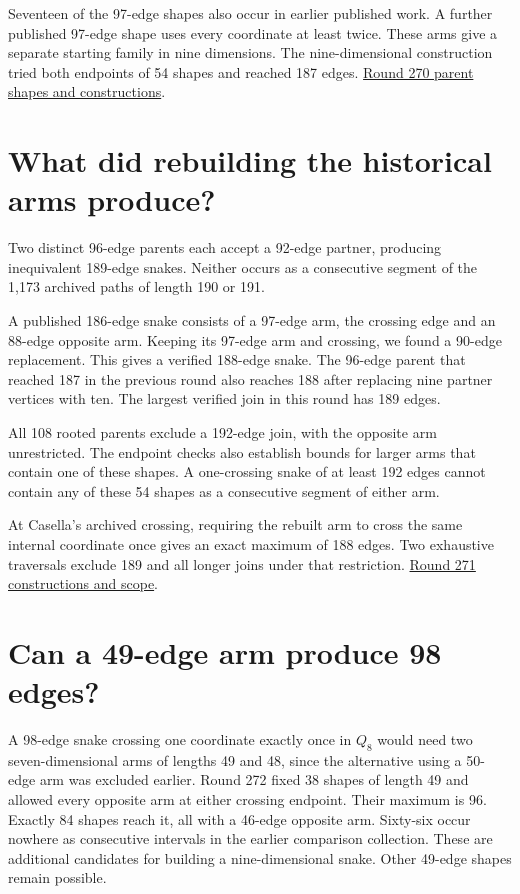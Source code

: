 \documentclass[11pt,a4paper]{article}
\begin{document}
Seventeen of the 97-edge shapes also occur in earlier published work.
A further published 97-edge shape uses every coordinate at least
twice. These arms give a separate starting family in nine dimensions.
The nine-dimensional construction tried both endpoints of 54 shapes and reached 187 edges.
\href{https://github.com/hironaka-iori/Snake-in-the-box-in-9/tree/main/milestones/270-optimal-seven-dimensional-arms}{Round 270 parent shapes and constructions}.

\section{What did rebuilding the historical arms produce?}
Two distinct 96-edge parents each accept a 92-edge partner, producing inequivalent 189-edge snakes. Neither occurs as a consecutive segment of the 1,173 archived paths of length 190 or 191.

A published 186-edge snake consists of a 97-edge arm, the crossing
edge and an 88-edge opposite arm. Keeping its 97-edge arm and crossing,
we found a 90-edge replacement. This gives a verified 188-edge snake.
The 96-edge parent that reached 187 in the previous round also reaches
188 after replacing nine partner vertices with ten. The largest verified join in this round has 189 edges.

All 108 rooted parents exclude a 192-edge join, with the opposite arm unrestricted. The endpoint checks also establish bounds for larger
arms that contain one of these shapes. A one-crossing snake of at least 192 edges cannot contain any of these 54 shapes as a consecutive segment of either arm.

At Casella's archived crossing, requiring the rebuilt arm to cross the same internal coordinate once gives an exact maximum of 188 edges. Two exhaustive traversals exclude 189 and all longer joins under that restriction.
\href{https://github.com/hironaka-iori/Snake-in-the-box-in-9/tree/main/milestones/271-rebuilt-historical-partners}{Round 271 constructions and scope}.

\section{Can a 49-edge arm produce 98 edges?}
A 98-edge snake crossing one coordinate exactly once in \(Q_8\) would need two seven-dimensional arms of lengths 49 and 48, since the alternative using a 50-edge arm was excluded earlier. Round 272 fixed 38 shapes of length 49 and allowed every opposite arm at either crossing endpoint. Their maximum is 96. Exactly 84 shapes reach it, all with a 46-edge opposite arm. Sixty-six occur nowhere as consecutive intervals in the earlier comparison collection. These are additional candidates for building a nine-dimensional snake. Other 49-edge shapes remain possible.
\end{document}
